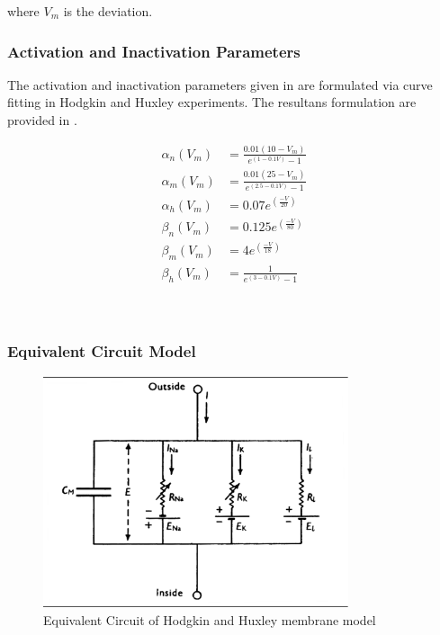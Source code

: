 \documentclass{IEEEtran}
\begin{document}
where $V_m$ is the deviation. \\

\subsubsection*{Activation and Inactivation Parameters}
The activation and inactivation parameters given in  are formulated via curve fitting in Hodgkin and Huxley experiments. The resultans formulation are provided in .

\begin{align}
    \alpha_n(V_m) &= \frac{0.01(10-V_m)}{e^{(1-0.1V)}-1} \label{eqn:a1}\\
    \alpha_m(V_m) &= \frac{0.01(25-V_m)}{e^{(2.5-0.1V)}-1} \label{eqn:a2}\\
    \alpha_h(V_m) &= 0.07e^{(\frac{-V}{20})} \label{eqn:a3}\\
    \beta_n(V_m) &= 0.125e^{(\frac{-V}{80})} \label{eqn:b1}\\
    \beta_m(V_m) &= 4e^{(\frac{-V}{18})} \label{eqn:b2}\\
    \beta_h(V_m) &= \frac{1}{e^{(3-0.1V)}-1} \label{eqn:b3}
\end{align}
\\
\\

\subsubsection*{Equivalent Circuit Model}
\begin{figure}[h]
\centering
\includegraphics[width=0.8\textwidth]{EQCCT.png}
\caption{Equivalent Circuit of Hodgkin and Huxley membrane model}\label{fig:eqcct}
\end{figure}
\end{document}

